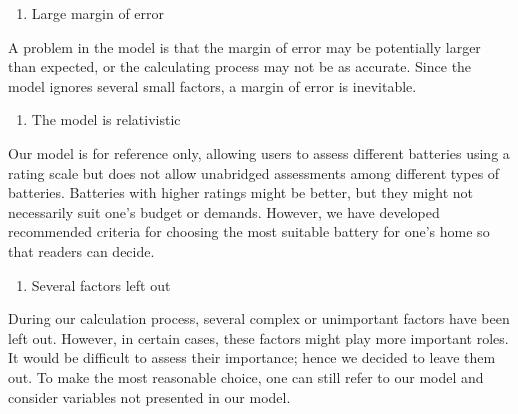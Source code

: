 \begin{enumerate}
    \item Large margin of error
\end{enumerate}
A problem in the model is that the margin of error may be potentially larger than expected, or the calculating process may not be as accurate. Since the model ignores several small factors, a margin of error is inevitable.
\begin{enumerate}[resume]
    \item The model is relativistic
\end{enumerate}
Our model is for reference only, allowing users to assess different batteries using a rating scale but does not allow unabridged assessments among different types of batteries. Batteries with higher ratings might be better, but they might not necessarily suit one's budget or demands. However, we have developed recommended criteria for choosing the most suitable battery for one's home so that readers can decide.
\begin{enumerate}[resume]
    \item Several factors left out
\end{enumerate}
During our calculation process, several complex or unimportant factors have been left out. However, in certain cases, these factors might play more important roles. It would be difficult to assess their importance; hence we decided to leave them out. To make the most reasonable choice, one can still refer to our model and consider variables not presented in our model.